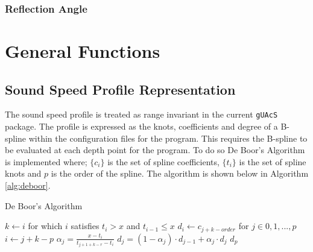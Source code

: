 \documentclass{article}
\begin{document}
\subsubsection{Reflection Angle}

\section{General Functions}
\subsection{Sound Speed Profile Representation}
The sound speed profile is treated as range invariant in the current \texttt{gUAcS} package. The profile is expressed as the knots, coefficients and degree of a B-spline within the configuration files for the program. This requires the B-spline to be evaluated at each depth point for the program. To do so De Boor's Algorithm is implemented where; $\{c_{i}\}$ is the set of spline coefficients, $\{t_{i}\}$ is the set of spline knots and $p$ is the order of the spline. The algorithm is shown below in Algorithm \ref{alg:deboor}.
\begin{algorithm}[H]
  \caption{De Boor's Algorithm}\label{alg:deboor}
  \begin{algorithmic}
    \State $k\gets i$ for which $i$ satisfies $t_{i} > x$ and $t_{i-1} \leq x$
    \State $d_i\gets c_{j + k -order}$ for $j\in{0,1,...,p}$
        \State $i\gets j + k - p$
        \State $\alpha_j = \frac{x - t_i}{t_{j + 1 + k - r} - t_{i}}$
        \State $d_j = (1 - \alpha_j)\cdot d_{j-1} + \alpha_j\cdot d_{j}$
      \EndFor
    \EndFor
    \Return $d_{p}$
  \end{algorithmic}
\end{algorithm}


\nocite{*}
\printbibliography
\end{document}
